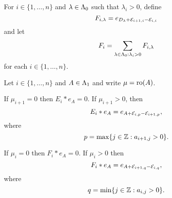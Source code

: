 \documentclass[a4paper, 11pt]{report}
\begin{document}
For $i\in\{1,\ldots,n\}$ and $\lambda\in\Lambda_0{}$ such that $\lambda_i>0$, define
\begin{equation*}
F_{i,\lambda} = e_{D_\lambda + \mathcal{E}_{i+1,i} - \mathcal{E}_{i,i}}
\end{equation*}
and let
\begin{equation*}
F_i = \sum_{\lambda\in\Lambda_0{}:\lambda_i>0} F_{i,\lambda}
\end{equation*}
for each $i\in\{1,\ldots,n\}$.

\begin{lemma}\label{lemma:fundamental-multiplication-rule-generic}
Let $i\in\{1,\ldots,n\}$ and $A\in\Lambda_1{}$ and write $\mu=\operatorname{ro}(A)$.

If $\mu_{i+1}=0$ then $E_i\ast e_A=0$. If $\mu_{i+1}>0$, then
\begin{equation*}
E_i\ast e_A = e_{A+\mathcal{E}_{i,p}-\mathcal{E}_{i+1,p}},
\end{equation*}
where
\begin{equation*}
p=\max\{j\in\mathbb{Z}:a_{i+1,j}>0\}.
\end{equation*}

If $\mu_i=0$ then $F_i\ast e_A=0$. If $\mu_i>0$ then
\begin{equation*}
F_i\ast e_A = e_{A+\mathcal{E}_{i+1,q}-\mathcal{E}_{i,q}},
\end{equation*}
where
\begin{equation*}
q=\min\{j\in\mathbb{Z}: a_{i,j}>0\}.
\end{equation*}
\end{lemma}
\end{document}
